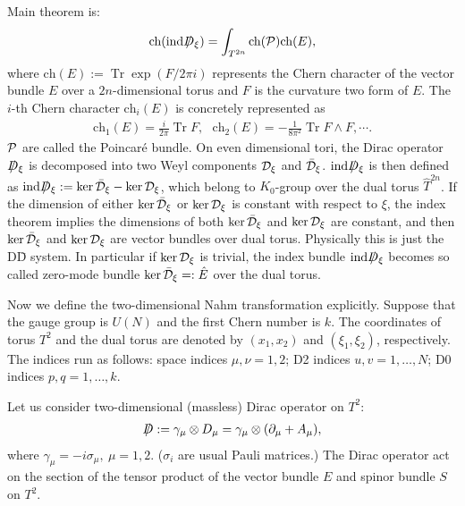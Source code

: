 \documentclass[a4paper,epsf,12pt]{article}
\newcommand{\cD}{{\cal D}}
\newcommand{\cP}{{\cal P}}
\newcommand{\del}{\partial}
\newcommand{\fr}{\frac}
\newcommand{\Dsl}{\mbox{\ooalign{\hfil/\hfil\crcr$D$}}}
\newcommand{\Th}{\hat{T}}
\def \cD{{\cal D}}
\def \cDb{{\bar {\cal D}}}
\DeclareMathOperator{\Tr}{Tr}
\def \ch{\mbox{ch}}
\def \Eh{\hat{E}}
\begin{document}
Main theorem is:
\begin{eqnarray}
\label{f_index}
\ch({\mbox{ind}} \Dsl_\xi)=\int_{T^{2n}}\ch(\cP)\ch(E),
\end{eqnarray}
where $\ch(E):=\Tr \exp(F/2\pi i)$ 
represents the Chern character of the vector bundle $E$
over a $2n$-dimensional torus and $F$ is the curvature two form of $E$.
The $i$-th Chern character $\ch_i(E)$ is concretely represented as
\begin{eqnarray*}
\ch_1(E)=\fr{i}{2\pi}\Tr F,~~~\ch_2(E)=-\fr{1}{8\pi^2}\Tr F\wedge F,\cdots.
\end{eqnarray*}
$\cP$ are called 
the Poincar\'e bundle.
On even dimensional tori, the Dirac operator $\Dsl_\xi$
is decomposed into two Weyl components $\cD_\xi$ and $\cDb_\xi$. 
$\mbox{ind} \Dsl_\xi$ is then defined as 
$\mbox{ind} \Dsl_\xi:=\ker\cDb_\xi-\ker \cD_\xi$, which belong to 
$K_0$-group over the dual torus $\Th^{2n}$. 
If the dimension of either $\ker\cDb_\xi$ or $\ker \cD_\xi$ is constant 
with respect to $\xi$, the index theorem implies the dimensions 
of both $\ker\cDb_\xi$ and $\ker \cD_\xi$ are constant, and then 
$\ker\cDb_\xi$ and $\ker \cD_\xi$ are vector bundles over dual torus. 
Physically this is just the D\=D system. In particular 
if $\ker \cD_\xi$ is trivial, the index bundle $\mbox{ind}\Dsl_\xi$ becomes
so called zero-mode bundle $\ker\cDb_\xi=:\Eh$ 
over the dual torus. 
\vspace{2mm}

Now we define the two-dimensional Nahm transformation explicitly.
Suppose that
the gauge group is $U(N)$ and 
the first Chern number is $k$.
The coordinates of torus $T^2$ and the dual torus 
are denoted by $(x_1,x_2)$ and $(\xi_1,\xi_2)$, respectively.
The indices run as follows: 
space indices $\mu,\nu=1,2$;
D2 indices $u,v=1,\ldots,N$;
D0 indices $p,q=1,\ldots,k$.

Let us consider two-dimensional (massless) Dirac operator on $T^2$:
\begin{eqnarray*}
\Dsl:=\gamma_\mu \otimes D_{\mu}=\gamma_\mu \otimes (\del_\mu+A_\mu),
\end{eqnarray*}
where $\gamma_\mu=-i\sigma_\mu, ~\mu=1,2$. 
($\sigma_i$ are usual Pauli matrices.)
The Dirac operator act on the section of the tensor product of
the vector bundle $E$ and spinor bundle $S$ on $T^2$.
\end{document}
